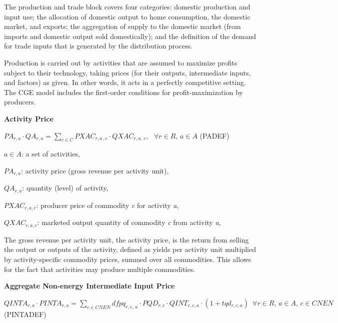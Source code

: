\documentclass[10pt,a4paper,titlepage,dvipdfmx]{book}
\begin{document}
The production and trade block covers four categories: domestic production and input use; the allocation of domestic output to home consumption, the domestic market, and exports; the aggregation of supply to the domestic market (from imports and domestic output sold domestically); and the definition of the demand for trade inputs that is generated by the distribution process.

Production is carried out by activities that are assumed to maximize profits subject to their technology, taking prices (for their outputs, intermediate inputs, and factors) as given. In other words, it acts in a perfectly competitive setting. The CGE model includes the first-order conditions for profit-maximization by producers. 

\begin{flushleft}\textbf{Activity Price}\end{flushleft}


\begin{center}$PA_{r,a}\cdot QA_{r,a}=\sum _{c\in C}PXAC_{r,a\,,c}\cdot QXAC_{r,a,\,c},\,\,\,\,\forall r\in R,\,a\in A$ (PADEF)
\end{center}
\begin{flushleft}
$a\in A$: a set of activities,

$PA_{r,a}$: activity price (gross revenue per activity unit),

$QA_{r,a}$: quantity (level) of activity,

$PXAC_{r,a,c}$: producer price of commodity \textit{c} for activity \textit{a},

$QXAC_{r,a,c}$: marketed output quantity of commodity \textit{c} from activity \textit{a,}
\end{flushleft}

The gross revenue per activity unit, the activity price, is the return from selling the output or outputs of the activity, defined as yields per activity unit multiplied by activity-specific commodity prices, summed over all commodities. This allows for the fact that activities may produce multiple commodities.

\begin{flushleft}\textbf{Aggregate Non-energy Intermediate Input Price}\end{flushleft}


\begin{center}$QINTA_{r,a}\cdot PINTA_{r,a}=\sum _{c\in CNEN}dfpq_{r,c,\,a}\cdot PQD_{r,c}\cdot QINT_{r,c,a}\cdot (1+tqd_{r,c,a})\,\,\,\forall r\in R,\,a\in A,\,c\in CNEN$ (PINTADEF)
\end{center}
\end{document}
